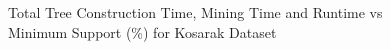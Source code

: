             
            \begin{figure}[h]
            \centering
                
                
                
            \caption{Total Tree Construction Time, Mining Time and Runtime vs Minimum Support (\%) for Kosarak Dataset }
            \label{result:g_k_tree_construction_total}
            \end{figure}
            

            
\clearpage
